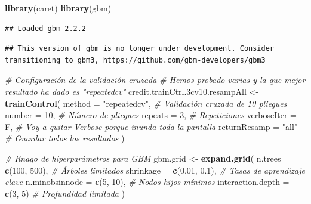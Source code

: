 \documentclass[
]{article}
\newenvironment{Shaded}{\begin{snugshade}}{\end{snugshade}}
\newcommand{\AttributeTok}[1]{\textcolor[rgb]{0.13,0.29,0.53}{#1}}
\newcommand{\CommentTok}[1]{\textcolor[rgb]{0.56,0.35,0.01}{\textit{#1}}}
\newcommand{\DecValTok}[1]{\textcolor[rgb]{0.00,0.00,0.81}{#1}}
\newcommand{\FloatTok}[1]{\textcolor[rgb]{0.00,0.00,0.81}{#1}}
\newcommand{\FunctionTok}[1]{\textcolor[rgb]{0.13,0.29,0.53}{\textbf{#1}}}
\newcommand{\NormalTok}[1]{#1}
\newcommand{\OtherTok}[1]{\textcolor[rgb]{0.56,0.35,0.01}{#1}}
\newcommand{\StringTok}[1]{\textcolor[rgb]{0.31,0.60,0.02}{#1}}
\begin{document}
\begin{Shaded}
\begin{Highlighting}[]
\FunctionTok{library}\NormalTok{(caret)}
\FunctionTok{library}\NormalTok{(gbm)}
\end{Highlighting}
\end{Shaded}

\begin{verbatim}
## Loaded gbm 2.2.2
\end{verbatim}

\begin{verbatim}
## This version of gbm is no longer under development. Consider transitioning to gbm3, https://github.com/gbm-developers/gbm3
\end{verbatim}

\begin{Shaded}
\begin{Highlighting}[]
\CommentTok{\# Configuración de la validación cruzada}
\CommentTok{\# Hemos probado varias y la que mejor resultado ha dado es "repeatedcv"}
\NormalTok{credit.trainCtrl}\FloatTok{.3}\NormalTok{cv10.resampAll }\OtherTok{\textless{}{-}} \FunctionTok{trainControl}\NormalTok{(}
  \AttributeTok{method =} \StringTok{"repeatedcv"}\NormalTok{, }\CommentTok{\# Validación cruzada de 10 pliegues}
  \AttributeTok{number =} \DecValTok{10}\NormalTok{,           }\CommentTok{\# Número de pliegues}
  \AttributeTok{repeats =} \DecValTok{3}\NormalTok{,           }\CommentTok{\# Repeticiones}
  \AttributeTok{verboseIter =}\NormalTok{ F,       }\CommentTok{\# Voy a quitar Verbose porque inunda toda la pantalla}
  \AttributeTok{returnResamp =} \StringTok{"all"}   \CommentTok{\# Guardar todos los resultados}
\NormalTok{)}

\CommentTok{\# Rnago de hiperparámetros para GBM}
\NormalTok{gbm.grid }\OtherTok{\textless{}{-}} \FunctionTok{expand.grid}\NormalTok{(}
  \AttributeTok{n.trees =} \FunctionTok{c}\NormalTok{(}\DecValTok{100}\NormalTok{, }\DecValTok{500}\NormalTok{),              }\CommentTok{\# Árboles limitados}
  \AttributeTok{shrinkage =} \FunctionTok{c}\NormalTok{(}\FloatTok{0.01}\NormalTok{, }\FloatTok{0.1}\NormalTok{),           }\CommentTok{\# Tasas de aprendizaje clave}
  \AttributeTok{n.minobsinnode =} \FunctionTok{c}\NormalTok{(}\DecValTok{5}\NormalTok{, }\DecValTok{10}\NormalTok{),          }\CommentTok{\# Nodos hijos mínimos}
  \AttributeTok{interaction.depth =} \FunctionTok{c}\NormalTok{(}\DecValTok{3}\NormalTok{, }\DecValTok{5}\NormalTok{)         }\CommentTok{\# Profundidad limitada}
\NormalTok{)}


\end{Highlighting}
\end{Shaded}
\end{document}
